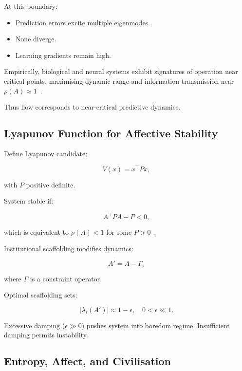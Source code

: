 \documentclass[12pt,a4paper]{article}
\theoremstyle{definition}
\begin{document}
At this boundary:

\begin{itemize}
  \item Prediction errors excite multiple eigenmodes.
  \item None diverge.
  \item Learning gradients remain high.
\end{itemize}

Empirically, biological and neural systems
exhibit signatures of operation near critical points,
maximising dynamic range and information transmission
near $\rho(A) \approx 1$~\citep{beggs2003,mora2011}.

Thus flow corresponds to near-critical predictive dynamics.

\subsection{Lyapunov Function for Affective Stability}

Define Lyapunov candidate:

\begin{equation}
  V(x) = x^\top P x,
\end{equation}

with $P$ positive definite.

System stable if:

\begin{equation}
  A^\top P A - P < 0,
\end{equation}

which is equivalent to $\rho(A) < 1$
for some $P > 0$~\citep{strogatz2018}.

Institutional scaffolding modifies dynamics:

\begin{equation}
  A' = A - \Gamma,
\end{equation}

where $\Gamma$ is a constraint operator.

Optimal scaffolding sets:

\begin{equation}
  |\lambda_i(A')| \approx 1 - \epsilon,
  \quad 0 < \epsilon \ll 1.
\end{equation}

Excessive damping ($\epsilon \gg 0$)
pushes system into boredom regime.
Insufficient damping permits instability.

\subsection{Entropy, Affect, and Civilisation}
\end{document}

